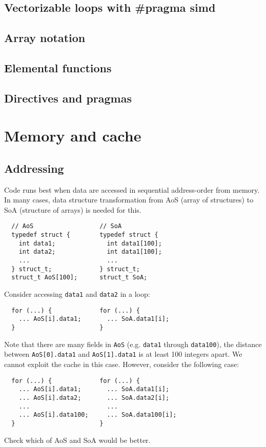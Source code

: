 \documentclass{myproc}
\begin{document}
\eit

\subsection{Vectorizable loops with \#pragma simd}
\subsection{Array notation}
\subsection{Elemental functions}

\subsection{Directives and pragmas}

\section{Memory and cache}
\subsection{Addressing}
\bit
\w Code runs best when data are accessed in sequential address-order from
memory. In many cases, data structure transformation from AoS (array of
structures) to SoA (structure of arrays) is
needed for this. 
  \begin{verbatim}
  // AoS                  // SoA
  typedef struct {        typedef struct {
    int data1;              int data1[100];
    int data2;              int data1[100];
    ...                     ...
  } struct_t;             } struct_t;
  struct_t AoS[100];      struct_t SoA;
  \end{verbatim}
\w Consider accessing \verb+data1+ and \verb+data2+ in a loop:
  \begin{verbatim}
  for (...) {             for (...) {
    ... AoS[i].data1;       ... SoA.data1[i];
  }                       }
  \end{verbatim}
\w Note that there are many fields in \verb+AoS+ (e.g. \verb+data1+ through
\verb+data100+), the distance between \verb+AoS[0].data1+ and
\verb+AoS[1].data1+ is at least 100 integers apart. We cannot exploit the
cache in this case.
\w However, consider the following case:
  \begin{verbatim}
  for (...) {             for (...) {
    ... AoS[i].data1;       ... SoA.data1[i];
    ... AoS[i].data2;       ... SoA.data2[i];
    ...                     ...
    ... AoS[i].data100;     ... SoA.data100[i];
  }                       }
  \end{verbatim}
  Check which of AoS and SoA would be better.
\eit
\end{document}
